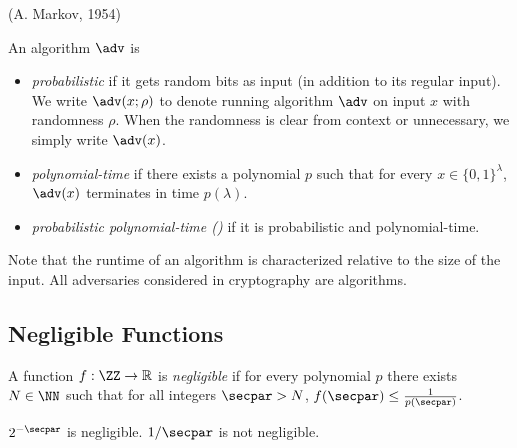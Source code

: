  (A. Markov, 1954)

\begin{definition}
An algorithm $\adv$ is
\begin{itemize}
\item \emph{probabilistic} if it gets random bits as input (in addition to its regular input).
We write $\adv(x; \rho)$ to denote running algorithm $\adv$ on input $x$ with randomness $\rho$.
When the randomness is clear from context or unnecessary, we simply write $\adv(x)$.
\item \emph{polynomial-time} if there exists a polynomial $p$ such that for every $x \in \{0,1\}^\lambda$, $\adv(x)$ terminates in time $p(\lambda)$.
\item \emph{probabilistic polynomial-time (\ppt)} if it is probabilistic and polynomial-time.
\end{itemize}
\end{definition}

Note that the runtime of an algorithm is characterized relative to the size of the input.
All adversaries considered in cryptography are algorithms.

\subsection{Negligible Functions}



\begin{definition}
A function $f: \ZZ \rightarrow \mathbb{R}$ is \emph{negligible} if for every polynomial $p$ there exists $N \in \NN$ such that for all integers $\secpar > N$, $f(\secpar) \le \frac{1}{p(\secpar)}$.
\end{definition}

\begin{example}
  $2^{-\secpar}$ is negligible. $1/\secpar$ is not negligible.
\end{example}

